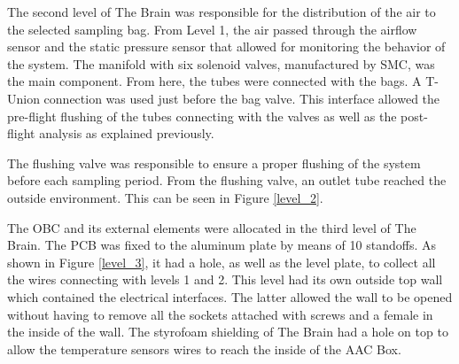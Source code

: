 The second level of The Brain was responsible for the distribution of the air to the selected sampling bag. From Level 1, the air passed through the airflow sensor and the static pressure sensor that allowed for monitoring the behavior of the system. The manifold with six solenoid valves, manufactured by SMC, was the main component. From here, the tubes were connected with the bags. A T-Union connection was used just before the bag valve. This interface allowed the pre-flight flushing of the tubes connecting with the valves as well as the post-flight analysis as explained previously. 

\smallskip
The flushing valve was responsible to ensure a proper flushing of the system before each sampling period. From the flushing valve, an outlet tube reached the outside environment. This can be seen in Figure \ref{level_2}.

The OBC and its external elements were allocated in the third level of The Brain. The PCB was fixed to the aluminum plate by means of 10 standoffs. As shown in Figure \ref{level_3}, it had a hole, as well as the level plate, to collect all the wires connecting with levels 1 and 2. This level had its own outside top wall which contained the electrical interfaces. The latter allowed the wall to be opened without having to remove all the sockets attached with screws and a female in the inside of the wall. The styrofoam shielding of The Brain had a hole on top to allow the temperature sensors wires to reach the inside of the AAC Box. 


